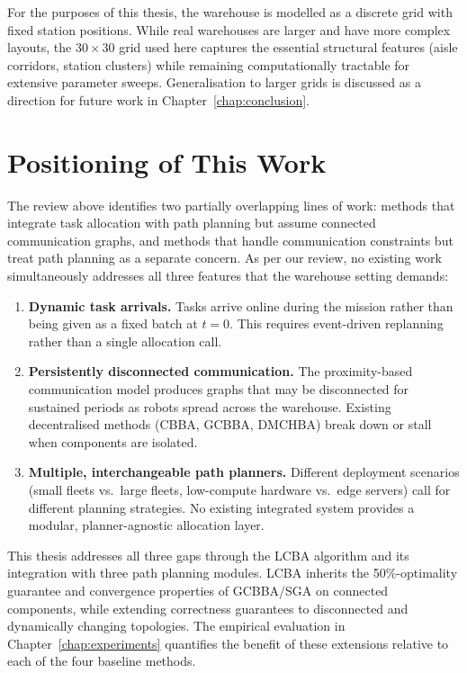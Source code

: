 For the purposes of this thesis, the warehouse is modelled as a discrete grid
with fixed station positions.
While real warehouses are larger and have more complex layouts, the $30 \times
30$ grid used here captures the essential structural features (aisle corridors,
station clusters) while remaining computationally tractable for extensive
parameter sweeps.
Generalisation to larger grids is discussed as a direction for future work in
Chapter~\ref{chap:conclusion}.


\section{Positioning of This Work}
\label{sec:bg_positioning}

The review above identifies two partially overlapping lines of work: methods
that integrate task allocation with path planning but assume connected
communication graphs, and methods that handle communication constraints but
treat path planning as a separate concern.
As per our review, no existing work simultaneously addresses all three features that the warehouse
setting demands:

\begin{enumerate}
  \item \textbf{Dynamic task arrivals.}
        Tasks arrive online during the mission rather than being given as a
        fixed batch at $t = 0$.
        This requires event-driven replanning rather than a single allocation
        call.
  \item \textbf{Persistently disconnected communication.}
        The proximity-based communication model produces graphs that may be
        disconnected for sustained periods as robots spread across the warehouse.
        Existing decentralised methods (CBBA, GCBBA, DMCHBA) break down or
        stall when components are isolated.
  \item \textbf{Multiple, interchangeable path planners.}
        Different deployment scenarios (small fleets vs.\ large fleets,
        low-compute hardware vs.\ edge servers) call for different planning
        strategies.
        No existing integrated system provides a modular, planner-agnostic
        allocation layer.
\end{enumerate}

This thesis addresses all three gaps through the LCBA algorithm and its
integration with three path planning modules.
LCBA inherits the 50\%-optimality guarantee and convergence properties
of GCBBA/SGA on connected components, while extending correctness guarantees to
disconnected and dynamically changing topologies.
The empirical evaluation in Chapter~\ref{chap:experiments} quantifies the
benefit of these extensions relative to each of the four baseline methods.
